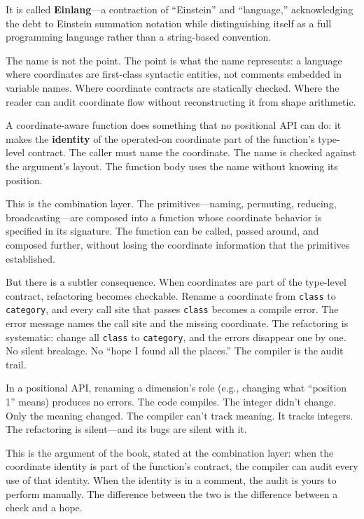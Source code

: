 \documentclass[11pt,titlepage]{article}
\begin{document}
It is called \textbf{Einlang}---a contraction of ``Einstein'' and
``language,'' acknowledging the debt to Einstein summation notation
while distinguishing itself as a full programming language rather than a
string-based convention.

The name is not the point. The point is what the name represents: a
language where coordinates are first-class syntactic entities, not
comments embedded in variable names. Where coordinate contracts are
statically checked. Where the reader can audit coordinate flow without
reconstructing it from shape arithmetic.

\vspace{2em}

A coordinate-aware function does something that no positional API can
do: it makes the \textbf{identity} of the operated-on coordinate part of
the function's type-level contract. The caller must name the coordinate.
The name is checked against the argument's layout. The function body
uses the name without knowing its position.

This is the combination layer. The primitives---naming, permuting,
reducing, broadcasting---are composed into a function whose coordinate
behavior is specified in its signature. The function can be called,
passed around, and composed further, without losing the coordinate
information that the primitives established.

But there is a subtler consequence. When coordinates are part of the
type-level contract, refactoring becomes checkable. Rename a coordinate
from \texttt{class} to \texttt{category}, and every call site that
passes \texttt{class} becomes a compile error. The error message names
the call site and the missing coordinate. The refactoring is systematic:
change all \texttt{class} to \texttt{category}, and the errors disappear
one by one. No silent breakage. No ``hope I found all the places.'' The
compiler is the audit trail.

In a positional API, renaming a dimension's role (e.g., changing what
``position 1'' means) produces no errors. The code compiles. The integer
didn't change. Only the meaning changed. The compiler can't track
meaning. It tracks integers. The refactoring is silent---and its bugs
are silent with it.

This is the argument of the book, stated at the combination layer: when
the coordinate identity is part of the function's contract, the compiler
can audit every use of that identity. When the identity is in a comment,
the audit is yours to perform manually. The difference between the two
is the difference between a check and a hope.
\end{document}
